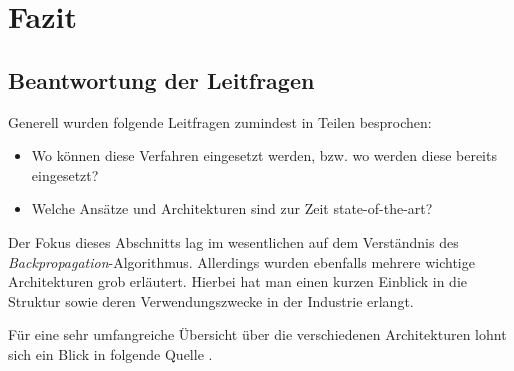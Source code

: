 \section{Fazit}


\subsection{Beantwortung der Leitfragen}

Generell wurden folgende Leitfragen zumindest in Teilen besprochen: 

\begin{itemize}
\item Wo können diese Verfahren eingesetzt werden, bzw. wo werden diese bereits eingesetzt?
\item Welche Ansätze und Architekturen sind zur Zeit state-of-the-art?
\end{itemize}

Der Fokus dieses Abschnitts lag im wesentlichen auf dem Verständnis des \emph{Backpropagation}-Algorithmus. Allerdings wurden ebenfalls mehrere wichtige Architekturen grob erläutert. Hierbei hat man einen kurzen Einblick in die Struktur sowie deren Verwendungszwecke in der Industrie erlangt.

Für eine sehr umfangreiche Übersicht über die verschiedenen Architekturen lohnt sich ein Blick in folgende Quelle \cite{archiOverview}.
